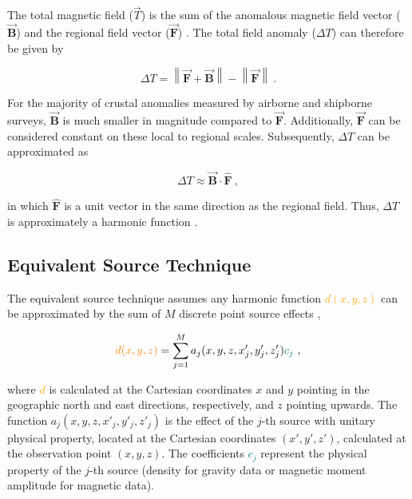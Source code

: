 \noindent
The total magnetic field ($\vec{T}$) is the sum of the anomalous magnetic field vector ($\vec{\mathbf{B}}$) and the regional field vector ($\vec{\mathbf{F}}$) \citep{Blakley1995, Langel1998, OliveiraJr2015}. The total field anomaly ($\Delta T$) can therefore be given by

\begin{equation}
    \Delta T = \left\lVert \vec{\mathbf{F}} + \vec{\mathbf{B}} \right\rVert - \left\lVert \vec{\mathbf{F}} \right\rVert
    \ .
\end{equation}

For the majority of crustal anomalies measured by airborne and shipborne surveys, $\vec{\mathbf{B}}$ is much smaller in magnitude compared to $\vec{\mathbf{F}}$. Additionally, $\vec{\mathbf{F}}$ can be considered constant on these local to regional scales. Subsequently, $\Delta T$ can be approximated as

\begin{equation}
\label{eq:tfa_dot_product}
    \Delta T\approx  \vec{\mathbf{B}} \cdot \hat{\mathbf{F}}
    \ ,
\end{equation}

\noindent
in which $\hat{\mathbf{F}}$ is a unit vector in the same direction as the regional field. Thus, $\Delta T$ is approximately a harmonic function \citep{Blakley1995,OliveiraJr2015}.

\subsection{Equivalent Source Technique}

The equivalent source technique assumes any harmonic function \textcolor{orange}{$d(x, y, z)$} can be approximated by the sum of $M$ discrete point source effects \citep{Dampney1969, Cordell1992},

\begin{equation}
\label{eq:eqs_technique}
\textcolor{orange}{d (x, y, z)} = \sum_{j=1}^{M} a_j(x, y, z, x'_j, y'_j , z'_j) \textcolor{teal}{c_j}
\ ,
\end{equation}

\noindent
where \textcolor{orange}{$d$} is calculated at the Cartesian coordinates $x$ and $y$ pointing in the geographic north and east directions, respectively, and $z$ pointing upwards. The function $a_j(x, y, z, x'_j, y'_j , z'_j)$ is the effect of the $j$-th source with unitary physical property, located at the Cartesian coordinates $(x', y', z')$, calculated at the observation point $(x, y, z)$.
The coefficients \textcolor{teal}{$c_j$} represent the physical property of the $j$-th source 
(density for gravity data or magnetic moment amplitude for magnetic data).

